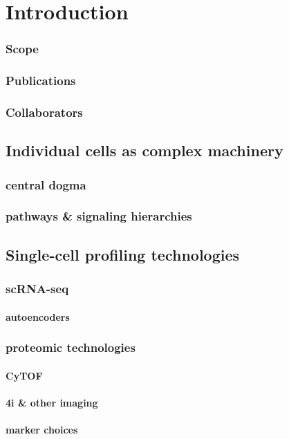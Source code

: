 \chapter{Introduction}
\subsection{Scope}
\subsection{Publications}
\subsection{Collaborators}

\section{Individual cells as complex machinery}
\subsection{central dogma}
\subsection{pathways \& signaling hierarchies}

\section{Single-cell profiling technologies}
\subsection{scRNA-seq}
\subsubsection{autoencoders}
\subsection{proteomic technologies}
\subsubsection{CyTOF}
\subsubsection{4i \& other imaging}
\subsubsection{marker choices}

